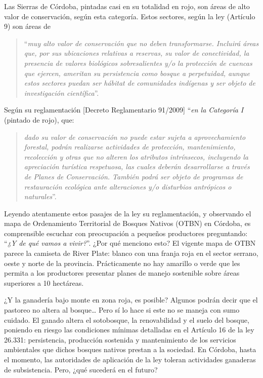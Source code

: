 \documentclass[
]{article}
\begin{document}
Las Sierras de Córdoba, pintadas casi en su totalidad en rojo, son áreas
de alto valor de conservación, según esta categoría. Estos sectores,
según la ley (Artículo 9) son áreas de

\begin{quote}
``\emph{muy alto valor de conservación que no deben transformarse.
Incluirá áreas que, por sus ubicaciones relativas a reservas, su valor
de conectividad, la presencia de valores biológicos sobresalientes y/o
la protección de cuencas que ejercen, ameritan su persistencia como
bosque a perpetuidad, aunque estos sectores puedan ser hábitat de
comunidades indígenas y ser objeto de investigación científica}''.
\end{quote}

Según su reglamentación {[}Decreto Reglamentario 91/2009{]} ``\emph{en
la Categoría I} (pintado de rojo), que:

\begin{quote}
\emph{dado su valor de conservación no puede estar sujeta a
aprovechamiento forestal, podrán realizarse actividades de protección,
mantenimiento, recolección y otras que no alteren los atributos
intrínsecos, incluyendo la apreciación turística respetuosa, las cuales
deberán desarrollarse a través de Planes de Conservación. También podrá
ser objeto de programas de restauración ecológica ante alteraciones y/o
disturbios antrópicos o naturales}''.
\end{quote}

Leyendo atentamente estos pasajes de la ley su reglamentación, y
observando el mapa de Ordenamiento Territorial de Bosques Nativos (OTBN)
en Córdoba, es comprensible escuchar con preocupación a pequeños
productores preguntando: ``\emph{¿Y de qué vamos a vivir?}''. ¿Por qué
menciono esto? El vigente mapa de OTBN parece la camiseta de River
Plate: blanco con una franja roja en el sector serrano, oeste y norte de
la provincia. Prácticamente no hay amarillo o verde que les permita a
los productores presentar planes de manejo sostenible sobre áreas
superiores a 10 hectáreas.

¿Y la ganadería bajo monte en zona roja, es posible? Algunos podrán
decir que el pastoreo no altera al bosque\ldots{} Pero sí lo hace si
este no se maneja con sumo cuidado. El ganado altera el sotobosque, la
renovabilidad y el suelo del bosque, poniendo en riesgo las condiciones
mínimas detalladas en el Artículo 16 de la ley 26.331: persistencia,
producción sostenida y mantenimiento de los servicios ambientales que
dichos bosques nativos prestan a la sociedad. En Córdoba, hasta el
momento, las autoridades de aplicación de la ley toleran actividades
ganaderas de subsistencia. Pero, ¿qué sucederá en el futuro?
\end{document}
